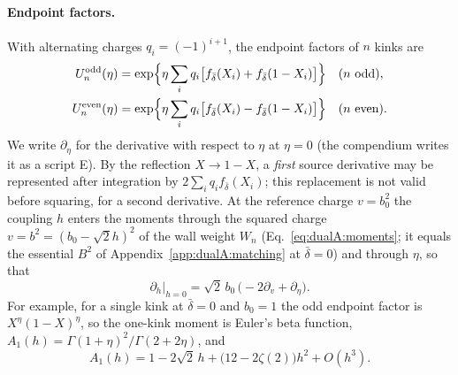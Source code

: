 \documentclass[11pt,a4paper]{article}
\numberwithin{equation}{section}
\newcommand{\db}{\bar\delta}
\begin{document}
\paragraph{Endpoint factors.} With alternating charges $q_i=(-1)^{i+1}$, the endpoint factors of $n$ kinks are
\begin{equation}
\begin{aligned}
 U_n^{\rm odd}(\eta)&=\exp\Bigl\{\eta\sum_iq_i\bigl[f_{\db}(X_i)+f_{\db}(1-X_i)\bigr]\Bigr\}&&(n\text{ odd}),\\
 U_n^{\rm even}(\eta)&=\exp\Bigl\{\eta\sum_iq_i\bigl[f_{\db}(X_i)-f_{\db}(1-X_i)\bigr]\Bigr\}&&(n\text{ even}).
\end{aligned}
\label{eq:dualA:endpoint}
\end{equation}
We write $\partial_\eta$ for the derivative with respect to $\eta$ at $\eta=0$ (the compendium writes it as a script E).
By the reflection $X\to1-X$, a \emph{first} source derivative may be represented after integration by
$2\sum_iq_if_{\db}(X_i)$; this replacement is not valid before squaring, for a second derivative. At the reference
charge $v=b_0^2$ the coupling $h$ enters the moments through the squared charge $v=b^2=(b_0-\sqrt2h)^2$ of the wall
weight $W_n$ (Eq.~\eqref{eq:dualA:moments}; it equals the essential $B^2$ of Appendix~\ref{app:dualA:matching} at
$\db=0$) and through $\eta$, so that
\begin{equation}
 \partial_h\big|_{h=0}=\sqrt2\,b_0\,\bigl(-2\partial_v+\partial_\eta\bigr).
 \label{eq:dualA:sourcechain}
\end{equation}
For example, for a single kink at $\db=0$ and $b_0=1$ the odd endpoint factor is $X^\eta(1-X)^\eta$, so the
one-kink moment is Euler's beta function, $A_1(h)=\Gamma(1+\eta)^2/\Gamma(2+2\eta)$, and
\begin{equation}
 A_1(h)=1-2\sqrt2\,h+\bigl(12-2\zeta(2)\bigr)h^2+O(h^3).
 \label{eq:dualA:A1}
\end{equation}

\end{document}
